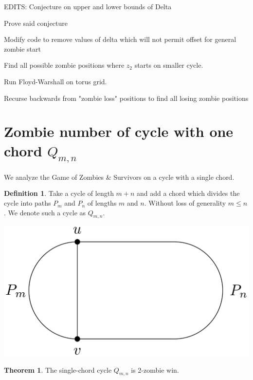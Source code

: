\documentclass[letterpaper, 10pt]{article}
\begin{document}
\theoremstyle{definition}
\newtheorem{definition}{Definition}
\newtheorem{theorem}{Theorem}
\newtheorem{proposition}{Proposition}
\newtheorem{corollary}{Corollary}
\newtheorem{lemma}{Lemma}
\newtheorem{proofpart}{Part}
\makeatletter
{}
\makeatother

EDITS: Conjecture on upper and lower bounds of Delta

Prove said conjecture

Modify code to remove values of delta which will not permit offset for general zombie start

Find all possible zombie positions where $z_2$ starts on smaller cycle.

Run Floyd-Warshall on torus grid.

Recurse backwards from "zombie loss" positions to find all losing zombie positions

\section{Zombie number of cycle with one chord $Q_{m,n}$}

We analyze the Game of Zombies \& Survivors on a cycle with a single chord.

\begin{definition}
 Take a cycle of length $m+n$ and add a chord which
 divides the cycle into paths $P_m$ and $P_n$ of lengths $m$ and $n$.
 Without loss of generality $m \leq n$. We denote such a cycle as $Q_{m,n}$.
\end{definition}

\begin{center}
 \includegraphics[scale=0.20]{Q_m_n_basic}
\end{center}

\begin{theorem}
 The single-chord cycle $Q_{m,n}$ is 2-zombie win.
\end{theorem}
\end{document}
